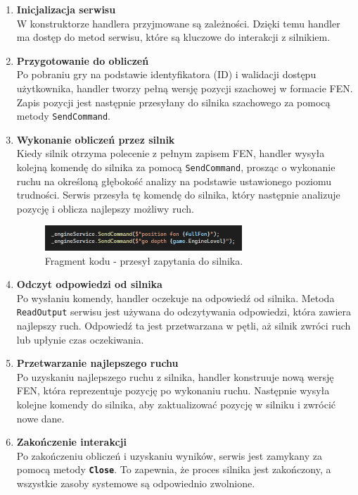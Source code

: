 \documentclass[twoside]{projektInzynierskiMS1}
\begin{document}
\begin{enumerate}
    \item \textbf{Inicjalizacja serwisu}\\
    W konstruktorze handlera przyjmowane są zależności. Dzięki temu handler ma dostęp do metod serwisu, które są kluczowe do interakcji z silnikiem.

    \item \textbf{Przygotowanie do obliczeń}\\
    Po pobraniu gry na podstawie identyfikatora (ID) i walidacji dostępu użytkownika, handler tworzy pełną wersję pozycji szachowej w formacie FEN. Zapis pozycji jest następnie przesyłany do silnika szachowego za pomocą metody \texttt{SendCommand}.

    \item \textbf{Wykonanie obliczeń przez silnik}\\
    Kiedy silnik otrzyma polecenie z pełnym zapisem FEN, handler wysyła kolejną komendę do silnika za pomocą \texttt{SendCommand}, prosząc o wykonanie ruchu na określoną głębokość analizy na podstawie ustawionego poziomu trudności. Serwis przesyła tę komendę do silnika, który następnie analizuje pozycję i oblicza najlepszy możliwy ruch.

    \begin{figure}[h!]
        \centering
        \includegraphics[width=0.7\textwidth]{images/ex_send_command.png}
        \caption{Fragment kodu - przesył zapytania do silnika.}
    \end{figure}

    \item \textbf{Odczyt odpowiedzi od silnika}\\
    Po wysłaniu komendy, handler oczekuje na odpowiedź od silnika. Metoda \texttt{ReadOutput} serwisu jest używana do odczytywania odpowiedzi, która zawiera najlepszy ruch. Odpowiedź ta jest przetwarzana w pętli, aż silnik zwróci ruch lub upłynie czas oczekiwania.

    \item \textbf{Przetwarzanie najlepszego ruchu}\\
    Po uzyskaniu najlepszego ruchu z silnika, handler konstruuje nową wersję FEN, która reprezentuje pozycję po wykonaniu ruchu. Następnie wysyła kolejne komendy do silnika, aby zaktualizować pozycję w silniku i zwrócić nowe dane.

    \item \textbf{Zakończenie interakcji}\\
    Po zakończeniu obliczeń i uzyskaniu wyników, serwis jest zamykany za pomocą metody \texttt{\textbf{Close}}. To zapewnia, że proces silnika jest zakończony, a wszystkie zasoby systemowe są odpowiednio zwolnione.
\end{enumerate}
\end{document}
